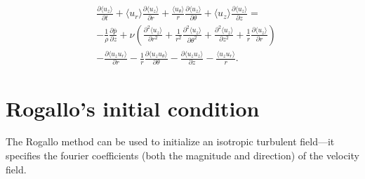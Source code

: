 \documentclass[oneside,a4paper,11pt]{report}
\newcommand{\pavg}{\overline{p}}
\begin{document}
\begin{align}
&\frac{\partial \langle u_z \rangle}{\partial t} + \langle u_r \rangle \frac{\partial \langle u_z \rangle}{\partial r} + \frac{\langle u_\theta \rangle}{r} \frac{\partial \langle u_z \rangle}{\partial \theta} + \langle u_z \rangle \frac{\partial \langle u_z \rangle}{\partial z} =  \nonumber \\
&-\frac{1}{\rho} \frac{\partial \pavg}{\partial z} + \nu \left ( \frac{\partial^2 \langle u_z \rangle}{\partial r^2} + \frac{1}{r^2} \frac{\partial^2 \langle u_z \rangle}{\partial \theta^2} + \frac{\partial^2 \langle u_z \rangle}{\partial z^2} + \frac{1}{r} \frac{\partial \langle u_z \rangle}{\partial r} \right ) \nonumber \\
&- \frac{\partial \langle u_z u_r \rangle}{\partial r} - \frac{1}{r} \frac{\partial \langle u_z u_\theta \rangle}{\partial \theta} - \frac{\partial \langle u_z u_z \rangle}{\partial z} - \frac{\langle u_z u_r \rangle}{r}.
\end{align}

%
\chapter{Rogallo's initial condition}
%
The Rogallo method \cite{rogallo1981} can be used to initialize an isotropic turbulent field---it specifies the fourier coefficients (both the magnitude and direction) of the velocity field.

\end{document}
